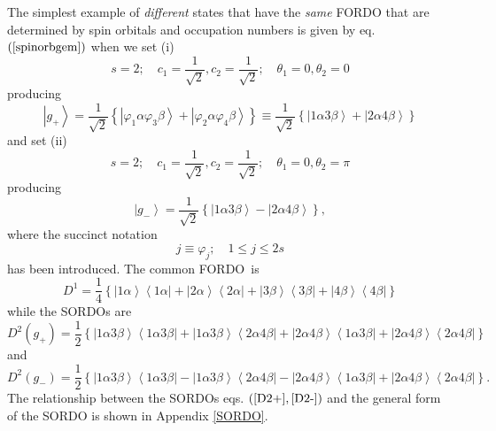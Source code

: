 \documentclass[aps,preprint]{revtex4}%
\begin{document}
The simplest example of \emph{different} states that have the \emph{same}
FORDO that are determined by spin orbitals and occupation numbers is given by
eq. $\left(  \ref{spinorbgem}\right)  $ when we set (i)
\begin{equation}
s=2;\quad c_{1}=\frac{1}{\sqrt{2}},c_{2}=\frac{1}{\sqrt{2}};\quad\theta
_{1}=0,\theta_{2}=0
\end{equation}
producing%
\begin{equation}
\left\vert g_{+}\right\rangle =\frac{1}{\sqrt{2}}\left\{  \left\vert
\varphi_{1}\alpha\varphi_{3}\beta\right\rangle +\left\vert \varphi_{2}%
\alpha\varphi_{4}\beta\right\rangle \right\}  \equiv\frac{1}{\sqrt{2}}\left\{
\left\vert 1\alpha3\beta\right\rangle +\left\vert 2\alpha4\beta\right\rangle
\right\}  \label{ex1}%
\end{equation}
and set (ii)
\begin{equation}
s=2;\quad c_{1}=\frac{1}{\sqrt{2}},c_{2}=\frac{1}{\sqrt{2}};\quad\theta
_{1}=0,\theta_{2}=\pi
\end{equation}
producing
\begin{equation}
\left\vert g_{-}\right\rangle =\frac{1}{\sqrt{2}}\left\{  \left\vert
1\alpha3\beta\right\rangle -\left\vert 2\alpha4\beta\right\rangle \right\}  ,
\label{ex2}%
\end{equation}
where the succinct notation
\begin{equation}
j\equiv\varphi_{j};\quad1\leq j\leq2s
\end{equation}
has been introduced. The common FORDO\ is
\begin{equation}
D^{1}=\frac{1}{4}\left\{  \left\vert 1\alpha\right\rangle \left\langle
1\alpha\right\vert +\left\vert 2\alpha\right\rangle \left\langle
2\alpha\right\vert +\left\vert 3\beta\right\rangle \left\langle 3\beta
\right\vert +\left\vert 4\beta\right\rangle \left\langle 4\beta\right\vert
\right\}  \label{D1+-}%
\end{equation}
while the SORDOs are
\begin{equation}
D^{2}\left(  g_{+}\right)  =\frac{1}{2}\left\{  \left\vert 1\alpha
3\beta\right\rangle \left\langle 1\alpha3\beta\right\vert +\left\vert
1\alpha3\beta\right\rangle \left\langle 2\alpha4\beta\right\vert +\left\vert
2\alpha4\beta\right\rangle \left\langle 1\alpha3\beta\right\vert +\left\vert
2\alpha4\beta\right\rangle \left\langle 2\alpha4\beta\right\vert \right\}
\label{D2+}%
\end{equation}
and
\begin{equation}
D^{2}\left(  g_{-}\right)  =\frac{1}{2}\left\{  \left\vert 1\alpha
3\beta\right\rangle \left\langle 1\alpha3\beta\right\vert -\left\vert
1\alpha3\beta\right\rangle \left\langle 2\alpha4\beta\right\vert -\left\vert
2\alpha4\beta\right\rangle \left\langle 1\alpha3\beta\right\vert +\left\vert
2\alpha4\beta\right\rangle \left\langle 2\alpha4\beta\right\vert \right\}  .
\label{D2-}%
\end{equation}
The relationship between the SORDOs eqs. $\left(  \ref{D2+},\ref{D2-}\right)
$ and the general form of the SORDO is shown in Appendix \ref{SORDO}.
\end{document}
